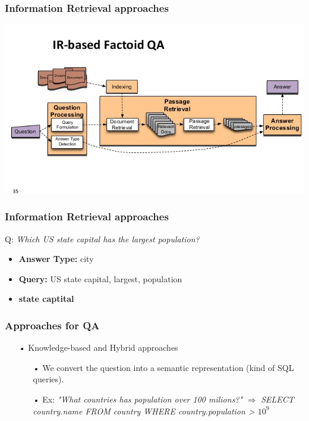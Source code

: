 \documentclass{beamer}
\begin{document}
\begin{frame} 
	\frametitle{Information Retrieval approaches} 
	\begin{center} 
		\centering 
			\includegraphics[width=\textwidth,height=\textheight,keepaspectratio]{irbase} 			
			\vspace{0.5cm} 
	\end{center} 
\end{frame} 

\begin{frame} 
	\frametitle{Information Retrieval approaches} 
	Q: \textit{Which US state capital has the largest population?} 
	\begin{itemize} 
		\item \textbf{Answer Type:} city 
		\item \textbf{Query:} US state capital, largest, population 
		\item \textbf{state captital} 
	\end{itemize} 
\end{frame} 

\begin{frame}
	\frametitle{Approaches for QA}		
		
	\begin{itemize}
		\item[•] Knowledge-based and Hybrid approaches
			\begin{itemize}
			\item[•] We convert the question into a semantic representation (kind of SQL queries).
			\item[•] Ex: \textit{"What countries has population over 100 milions?"} $\Rightarrow$ \textit{SELECT country.name FROM country WHERE country.population > $10^9$}
			\end{itemize}
	\end{itemize}		
		
\end{frame}
\end{document}
